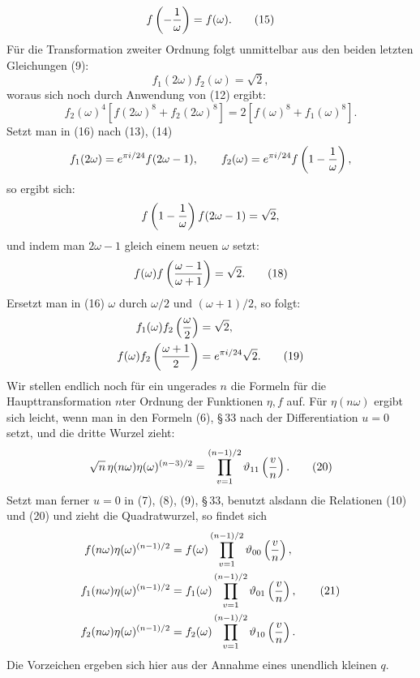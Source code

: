 \documentclass[11pt]{article}
\providecommand{\tht}{\vartheta}
\begin{document}
\begin{equation}
f\left(-{1\over\omega}\right)=f(\omega). \tag{15}
\end{equation}
Für die Transformation zweiter Ordnung folgt unmittelbar aus den beiden letzten Gleichungen (9):
\begin{equation}
f_1(2\omega)f_2(\omega)=\sqrt2, \tag{16}
\end{equation}
woraus sich noch durch Anwendung von (12) ergibt:
\begin{equation}
f_2(\omega)^4[f(2\omega)^8+f_2(2\omega)^8]=2[f(\omega)^8+f_1(\omega)^8]. \tag{17}
\end{equation}
Setzt man in (16) nach (13), (14)
\[
f_1(2\omega)=e^{\pi i/24}f(2\omega-1),
\qquad
f_2(\omega)=e^{\pi i/24}f\left(1-{1\over\omega}\right),
\]
so ergibt sich:
\[
f\left(1-{1\over\omega}\right)f(2\omega-1)=\sqrt2,
\]
und indem man $2\omega-1$ gleich einem neuen $\omega$ setzt:
\begin{equation}
f(\omega)f\left({\omega-1\over\omega+1}\right)=\sqrt2. \tag{18}
\end{equation}
Ersetzt man in (16) $\omega$ durch $\omega/2$ und $(\omega+1)/2$, so folgt:
\begin{align}
f_1(\omega)f_2\left({\omega\over2}\right)&=\sqrt2,\notag\\
f(\omega)f_2\left({\omega+1\over2}\right)&=e^{\pi i/24}\sqrt2. \tag{19}
\end{align}
Wir stellen endlich noch für ein ungerades $n$ die Formeln für die Haupttransformation $n$ter Ordnung der Funktionen $\eta,f$ auf. Für $\eta(n\omega)$ ergibt sich leicht, wenn man in den Formeln (6), \S\,33 nach der Differentiation $u=0$ setzt, und die dritte Wurzel zieht:
\begin{equation}
\sqrt n\,\eta(n\omega)\eta(\omega)^{(n-3)/2}
=\prod_{v=1}^{(n-1)/2}\tht_{11}\left({v\over n}\right). \tag{20}
\end{equation}
Setzt man ferner $u=0$ in (7), (8), (9), \S\,33, benutzt alsdann die Relationen (10) und (20) und zieht die Quadratwurzel, so findet sich
\begin{align}
f(n\omega)\eta(\omega)^{(n-1)/2}&=f(\omega)\prod_{v=1}^{(n-1)/2}\tht_{00}\left({v\over n}\right),\notag\\
f_1(n\omega)\eta(\omega)^{(n-1)/2}&=f_1(\omega)\prod_{v=1}^{(n-1)/2}\tht_{01}\left({v\over n}\right), \tag{21}\\
f_2(n\omega)\eta(\omega)^{(n-1)/2}&=f_2(\omega)\prod_{v=1}^{(n-1)/2}\tht_{10}\left({v\over n}\right).\notag
\end{align}
Die Vorzeichen ergeben sich hier aus der Annahme eines unendlich kleinen $q$.
\end{document}
